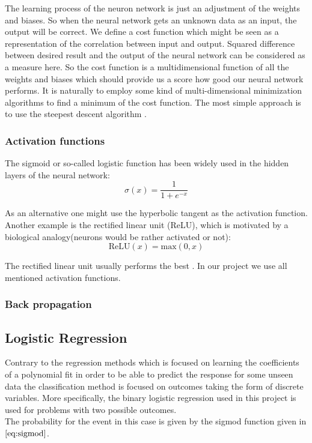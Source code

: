 \documentclass[10pt]{article}
\begin{document}
The learning process of the neuron network is just an adjustment of the weights and biases. So when the neural network gets an unknown data as an input, the output will be correct. We define a cost function which might be seen as a representation of the correlation between input and output. Squared difference between desired result and the output of the neural network can be considered as a measure here. So the cost function is a multidimensional function of all the weights and biases which should provide us a score how good our neural network performs. It is naturally to employ some kind of multi-dimensional minimization algorithms to find a minimum of the cost function. The most simple approach is to use the steepest descent algorithm \cite{Metha}.


\subsubsection{Activation functions}
The sigmoid or so-called logistic function has been widely used
in the hidden layers of the neural network:
\begin{equation}\label{eq:sigmod}
\sigma (x) = \frac{1}{1 + e^{-x}}
\end{equation}

As an alternative one might use the hyperbolic tangent as the activation function. Another example is the rectified linear unit (ReLU), which is motivated by a biological analogy(neurons would be rather activated or not):
\begin{equation*}
\text{ReLU} (x) = \text{max}(0,x)
\end{equation*}

The rectified linear unit usually performs the best \cite{Metha}. In our project we use all mentioned activation functions.

\subsubsection{Back propagation}

\subsection{Logistic Regression}
Contrary to the regression methods which is focused on learning the coefficients of a polynomial fit in order to be able to predict the response for some unseen data the classification method is focused on outcomes taking the form of discrete variables. More specifically, the binary logistic regression used in this project is used for problems with two possible outcomes. \\
The probability for the event in this case is given by the sigmod function given in $\ref{eq:sigmod}$. 
\end{document}
